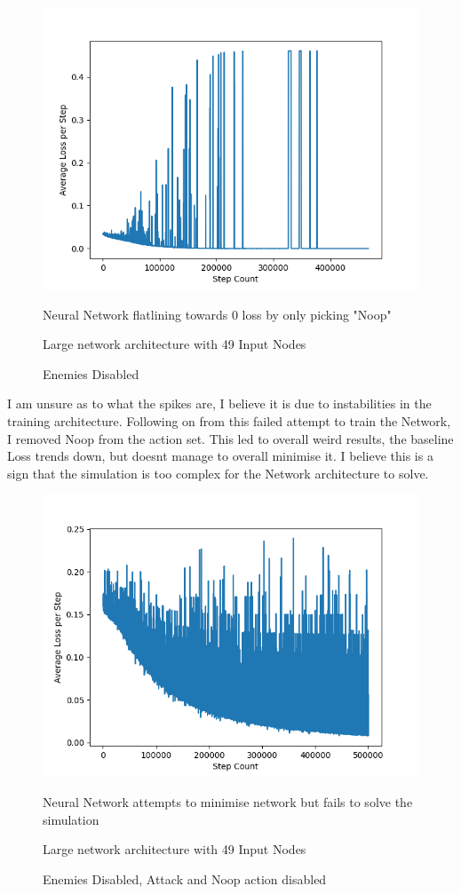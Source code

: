 \begin{flushleft}
        \begin{figure}[H]
            \centering
            \includegraphics[width=12cm]{Images/Evaluation/NullActionFlatline.png}
            \caption*{Neural Network flatlining towards 0 loss by only picking "Noop"}
            \caption*{Large network architecture with 49 Input Nodes} 
            \caption*{Enemies Disabled}
        \end{figure}

        I am unsure as to what the spikes are, I believe it is due to instabilities in the training architecture. Following on from this failed attempt
        to train the Network, I removed Noop from the action set. This led to overall weird results, the baseline Loss trends down, but doesnt manage to
        overall minimise it. I believe this is a sign that the simulation is too complex for the Network architecture to solve. 

        \begin{figure}[H]
            \centering
            \includegraphics[width=12cm]{Images/Evaluation/AttemptedMinimiseLargeNetwork.png}
            \caption*{Neural Network attempts to minimise network but fails to solve the simulation}
            \caption*{Large network architecture with 49 Input Nodes} 
            \caption*{Enemies Disabled, Attack and Noop action disabled}
        \end{figure}


\end{flushleft}
